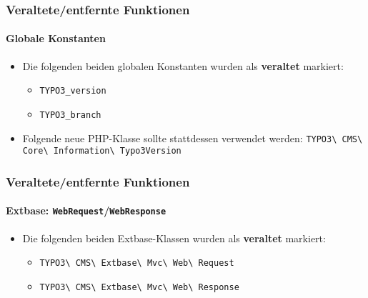 \begin{frame}[fragile]
	\frametitle{Veraltete/entfernte Funktionen}
	\framesubtitle{Globale Konstanten}

	\lstset{basicstyle=\smaller\ttfamily}

	\begin{itemize}
		\item Die folgenden beiden globalen Konstanten wurden als \textbf{veraltet} markiert:

			\begin{itemize}
				\item \texttt{TYPO3\_version}
				\item \texttt{TYPO3\_branch}
			\end{itemize}

		\item Folgende neue PHP-Klasse sollte stattdessen verwendet werden:\newline
			\small
				\texttt{TYPO3\textbackslash
					CMS\textbackslash
					Core\textbackslash
					Information\textbackslash
					Typo3Version}\normalsize

	\end{itemize}

\end{frame}


\begin{frame}[fragile]
	\frametitle{Veraltete/entfernte Funktionen}
	\framesubtitle{Extbase: \texttt{WebRequest}/\texttt{WebResponse}}

	\begin{itemize}
		\item Die folgenden beiden Extbase-Klassen wurden als \textbf{veraltet} markiert:
			\begin{itemize}
				\item \texttt{TYPO3\textbackslash
					CMS\textbackslash
					Extbase\textbackslash
					Mvc\textbackslash
					Web\textbackslash
					Request}
				\item \texttt{TYPO3\textbackslash
					CMS\textbackslash
					Extbase\textbackslash
					Mvc\textbackslash
					Web\textbackslash
					Response}
			\end{itemize}

	\end{itemize}

\end{frame}

